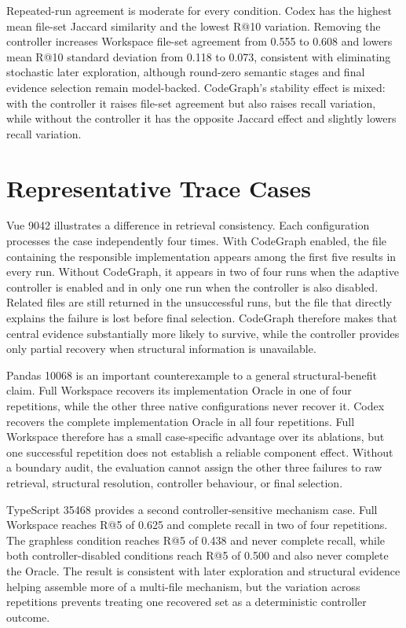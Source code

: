 Repeated-run agreement is moderate for every condition. Codex has the highest mean file-set Jaccard similarity and the lowest R@10 variation. Removing the controller increases Workspace file-set agreement from 0.555 to 0.608 and lowers mean R@10 standard deviation from 0.118 to 0.073, consistent with eliminating stochastic later exploration, although round-zero semantic stages and final evidence selection remain model-backed. CodeGraph's stability effect is mixed: with the controller it raises file-set agreement but also raises recall variation, while without the controller it has the opposite Jaccard effect and slightly lowers recall variation.

\section{Representative Trace Cases}\label{sec:representative-trace-cases}

Vue 9042 illustrates a difference in retrieval consistency. Each configuration processes the case independently four times. With CodeGraph enabled, the file containing the responsible implementation appears among the first five results in every run. Without CodeGraph, it appears in two of four runs when the adaptive controller is enabled and in only one run when the controller is also disabled. Related files are still returned in the unsuccessful runs, but the file that directly explains the failure is lost before final selection. CodeGraph therefore makes that central evidence substantially more likely to survive, while the controller provides only partial recovery when structural information is unavailable.

Pandas 10068 is an important counterexample to a general structural-benefit claim. Full Workspace recovers its implementation Oracle in one of four repetitions, while the other three native configurations never recover it. Codex recovers the complete implementation Oracle in all four repetitions. Full Workspace therefore has a small case-specific advantage over its ablations, but one successful repetition does not establish a reliable component effect. Without a boundary audit, the evaluation cannot assign the other three failures to raw retrieval, structural resolution, controller behaviour, or final selection.

TypeScript 35468 provides a second controller-sensitive mechanism case. Full Workspace reaches R@5 of 0.625 and complete recall in two of four repetitions. The graphless condition reaches R@5 of 0.438 and never complete recall, while both controller-disabled conditions reach R@5 of 0.500 and also never complete the Oracle. The result is consistent with later exploration and structural evidence helping assemble more of a multi-file mechanism, but the variation across repetitions prevents treating one recovered set as a deterministic controller outcome.

